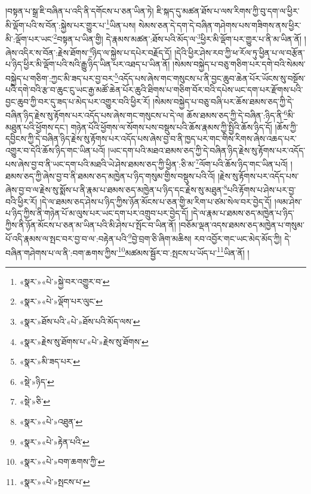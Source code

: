 །བསྟན་པ་སྒྲ་ཇི་བཞིན་པ་འདི་ནི་དགོངས་པ་ཅན་ཡིན་ཏེ། ཇི་སྐད་དུ་མཚན་ཐོས་པ་ལས་རིགས་ཀྱི་བུ་དག་ལ་ཕྱིར་མི་ལྡོག་པའི་ས་བོན་:སྐྱེས་པར་གྱུར་པ་\footnote{«སྣར་»«པེ་»སྐྱེ་བར་འགྱུར་བ་}ཡིན་པས། སེམས་ཅན་དེ་དག་དེ་བཞིན་གཤེགས་པས་གཟིགས་ནས་ཕྱིར་མི་:ལྡོག་པར་ཡང་\footnote{«སྣར་»«པེ་»ལྡོག་པར་ལུང་}བསྟན་པ་ཡིན་གྱི། དེ་རྣམས་མཚན་:ཐོས་པའི་མོད་ལ་\footnote{«སྣར་»ཐོས་པའི་«པེ་»ཐོས་པའི་མོད་ལས་}ཕྱིར་མི་ལྡོག་པར་གྱུར་པ་ནི་མ་ཡིན་ནོ། །ཞེས་འདིར་ས་བོན་:རྗེས་ཐོགས་\footnote{«སྣར་»རྗེས་སུ་ཐོགས་པ་«པེ་»རྗེས་སུ་ཐོགས་}ཉིད་ལ་སྐྱེས་པ་དཔེར་བརྗོད་དོ། །དེའི་ཕྱིར་ཤེས་རབ་ཀྱི་ཕ་རོལ་ཏུ་ཕྱིན་པ་ལ་བརྩོན་པ་ཉིད་ཕྱིར་མི་ལྡོག་པའི་སའི་རྒྱུ་ཉིད་ཡིན་པར་འཐད་པ་ཡིན་ནོ། །སེམས་བསྐྱེད་པ་བཅུ་གཅིག་པར་དགེ་བའི་སེམས་བསྐྱེད་པ་གཅིག་:ཀྱང་མི་ཟད་པར་བྱ་བར་\footnote{«སྣར་»མི་ཟད་པར་}འདོད་པས་ཞེས་གང་གསུངས་པ་ནི་བྱང་ཆུབ་ཆེན་པོར་ཡོངས་སུ་བསྔོས་པའི་དགེ་བའི་རྩ་བ་ཆུང་ངུ་ཡང་རྒྱ་མཚོ་ཆེན་པོར་ཆུའི་ཐིགས་པ་གཅིག་བོར་བའི་དཔེས་ཡང་དག་པར་རྫོགས་པའི་བྱང་ཆུབ་ཀྱི་བར་དུ་ཟད་པ་མེད་པར་འགྱུར་བའི་ཕྱིར་རོ། །སེམས་བསྐྱེད་པ་བཅུ་བཞི་པར་ཆོས་ཐམས་ཅད་ཀྱི་དེ་བཞིན་ཉིད་རྗེས་སུ་རྟོགས་པར་འདོད་པས་ཞེས་གང་གསུངས་པ་དེ་ལ། ཆོས་ཐམས་ཅད་ཀྱི་དེ་བཞིན་:ཉིད་ནི་\footnote{«སྡེ་»ཉིད་}མི་མཐུན་པའི་ཕྱོགས་དང་། གཉེན་པོའི་ཕྱོགས་ལ་སོགས་པས་བསྡུས་པའི་ཆོས་རྣམས་ཀྱི་སྤྱིའི་ཆོས་ཉིད་དོ། །ཆོས་ཀྱི་དབྱིངས་ཀྱི་དེ་བཞིན་ཉིད་རྗེས་སུ་རྟོགས་པར་འདོད་པས་ཞེས་བྱ་བ་ནི་ཁྱད་པར་གང་གིས་རིགས་ཞེས་འཆད་པར་འགྱུར་བ་དེའི་ཆོས་ཉིད་གང་ཡིན་པའོ། །ཡང་དག་པའི་མཐའ་ཐམས་ཅད་ཀྱི་དེ་བཞིན་ཉིད་རྗེས་སུ་རྟོགས་པར་འདོད་པས་ཞེས་བྱ་བ་ནི་ཡང་དག་པའི་མཐའི་ཡེ་ཤེས་ཐམས་ཅད་ཀྱི་ཕྱིན་:ཅི་མ་\footnote{«སྡེ་»ཅི་}ལོག་པའི་ཆོས་ཉིད་གང་ཡིན་པའོ། །ཐམས་ཅད་ཀྱི་ཞེས་བྱ་བ་ནི་ཐམས་ཅད་མཁྱེན་པ་ཉིད་གསུམ་གྱིས་བསྡུས་པའི་འོ། །རྗེས་སུ་རྟོགས་པར་འདོད་པས་ཞེས་བྱ་བ་ལ་རྗེས་སུ་སྨོས་པ་ནི་རྣམ་པ་ཐམས་ཅད་མཁྱེན་པ་ཉིད་དང་རྗེས་སུ་མཐུན་\footnote{«སྣར་»«པེ་»འཐུན་}པའི་རྟོགས་པ་ཤེས་པར་བྱ་བའི་ཕྱིར་རོ། །དེ་ལ་ཐམས་ཅད་ཤེས་པ་ཉིད་ཀྱིས་ཉོན་མོངས་པ་ཅན་གྱི་མ་རིག་པ་ཙམ་སེལ་བར་བྱེད་དོ། །ལམ་ཤེས་པ་ཉིད་ཀྱིས་ནི་གཉེན་པོ་མ་ལུས་པར་ཡང་དག་པར་འགྲུབ་པར་བྱེད་དོ། །དེ་ལ་རྣམ་པ་ཐམས་ཅད་མཁྱེན་པ་ཉིད་ཀྱིས་ནི་ཉོན་མོངས་པ་ཅན་མ་ཡིན་པའི་མི་ཤེས་པ་སྤོང་བ་ཡིན་ནོ། །བཅོམ་ལྡན་འདས་ཐམས་ཅད་མཁྱེན་པ་གསུམ་པོ་འདི་རྣམས་ལ་སྤང་བར་བྱ་བ་ལ་:བརྟེན་པའི་\footnote{«སྣར་»«པེ་»རྟེན་པའི་}བྱེ་བྲག་ཅི་ཞིག་མཆིས། རབ་འབྱོར་གང་ཡང་མེད་མོད་ཀྱི། དེ་བཞིན་གཤེགས་པ་ལ་ནི་:བག་ཆགས་ཀྱིས་\footnote{«སྣར་»«པེ་»བག་ཆགས་ཀྱི་}མཚམས་སྦྱོར་བ་:སྤངས་པ་ཡོད་པ་\footnote{«སྣར་»«པེ་»སྤངས་པ་}ཡིན་ནོ། །
